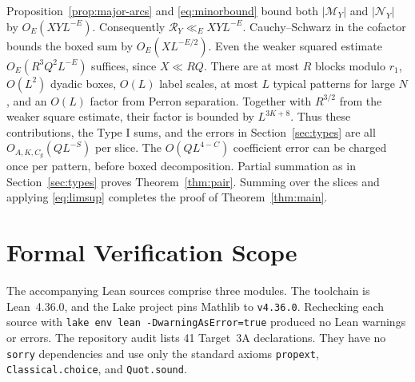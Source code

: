 \documentclass[11pt]{amsart}
\numberwithin{equation}{section}
\theoremstyle{remark}
\begin{document}
Proposition~\ref{prop:major-arcs} and \eqref{eq:minorbound} bound both $|\mathcal M_Y|$ and $|\mathcal N_Y|$ by $O_E(XYL^{-E})$. Consequently $\mathcal R_Y\ll_E XYL^{-E}$. Cauchy--Schwarz in the cofactor bounds the boxed sum by $O_E(XL^{-E/2})$. Even the weaker squared estimate $O_E(R^3Q^2L^{-E})$ suffices, since $X\ll RQ$. There are at most $R$ blocks modulo $r_1$, $O(L^2)$ dyadic boxes, $O(L)$ label scales, at most $L$ typical patterns for large $N$, and an $O(L)$ factor from Perron separation. Together with $R^{3/2}$ from the weaker square estimate, their factor is bounded by $L^{3K+8}$. Thus these contributions, the Type I sums, and the errors in Section~\ref{sec:types} are all $O_{A,K,C_g}(QL^{-S})$ per slice. The $O(QL^{4-C})$ coefficient error can be charged once per pattern, before boxed decomposition. Partial summation as in Section~\ref{sec:types} proves Theorem~\ref{thm:pair}. Summing over the slices and applying \eqref{eq:limsup} completes the proof of Theorem~\ref{thm:main}.

\section{Formal Verification Scope}\label{sec:formal-verification}
\raggedbottom
\begingroup
\raggedright

The accompanying Lean sources comprise three modules. The toolchain is
Lean~4.36.0, and the Lake project pins Mathlib to \texttt{v4.36.0}.
Rechecking each source with \verb|lake env lean -DwarningAsError=true|
produced no Lean warnings or errors. The repository audit
 lists 41 Target~3A declarations.
They have no \texttt{sorry} dependencies and use only the standard axioms
\texttt{propext}, \texttt{Classical.choice}, and \texttt{Quot.sound}.
\end{document}
